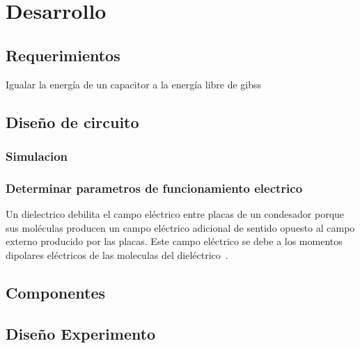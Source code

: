 \documentclass[12pt,twoside,onecolumn]{article}
\begin{document}
\section{Desarrollo}

\subsection{Requerimientos}

Igualar la energía de un capacitor a la energía libre de gibss

\subsection{Diseño de circuito}

\subsubsection{Simulacion}


\subsubsection{Determinar parametros de funcionamiento electrico}
Un dielectrico debilita el campo eléctrico entre placas de un condesador porque sus moléculas producen un campo eléctrico adicional de sentido opuesto al campo externo producido por las placas. Este campo eléctrico se debe a los momentos dipolares eléctricos de las moleculas del dieléctrico~\cite{tipler2005fisica}.

\subsection{Componentes}

\subsection{Diseño Experimento}


\newpage


{}
\end{document}
